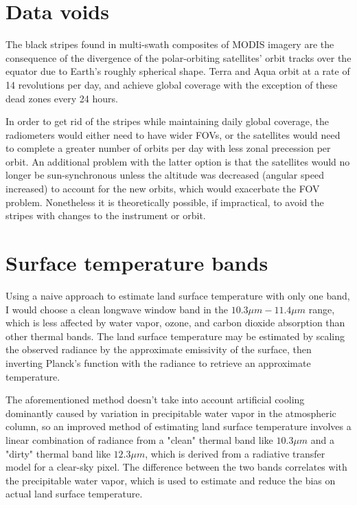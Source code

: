 \documentclass[12pt]{article}
\begin{document}
\clearpage

\section{Data voids}

The black stripes found in multi-swath composites of MODIS imagery are the consequence of the divergence of the polar-orbiting satellites' orbit tracks over the equator due to Earth's roughly spherical shape. Terra and Aqua orbit at a rate of 14 revolutions per day, and achieve global coverage with the exception of these dead zones every 24 hours.

In order to get rid of the stripes while maintaining daily global coverage, the radiometers would either need to have wider FOVs, or the satellites would need to complete a greater number of orbits per day with less zonal precession per orbit. An additional problem with the latter option is that the satellites would no longer be sun-synchronous unless the altitude was decreased (angular speed increased) to account for the new orbits, which would exacerbate the FOV problem. Nonetheless it is theoretically possible, if impractical, to avoid the stripes with changes to the instrument or orbit.

\section{Surface temperature bands}

Using a naive approach to estimate land surface temperature with only one band, I would choose a clean longwave window band in the $10.3\mu m - 11.4\mu m$ range, which is less affected by water vapor, ozone, and carbon dioxide absorption than other thermal bands. The land surface temperature may be estimated by scaling the observed radiance by the approximate emissivity of the surface, then inverting Planck's function with the radiance to retrieve an approximate temperature.

The aforementioned method doesn't take into account artificial cooling dominantly caused by variation in precipitable water vapor in the atmospheric column, so an improved method of estimating land surface temperature involves a linear combination of radiance from a "clean" thermal band like $10.3\mu m$ and a "dirty" thermal band like $12.3\mu m$, which is derived from a radiative transfer model for a clear-sky pixel. The difference between the two bands correlates with the precipitable water vapor, which is used to estimate and reduce the bias on actual land surface temperature.
\end{document}
